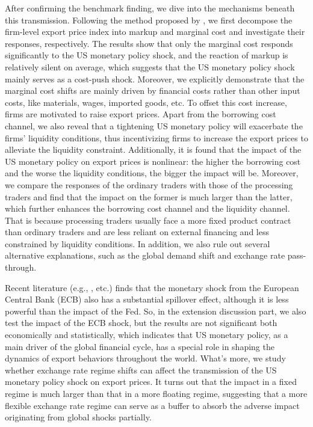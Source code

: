After confirming the benchmark finding, we dive into the mechanisms beneath this transmission. Following the method proposed by \cite{deloecker2012markups}, we first decompose the firm-level export price index into markup and marginal cost and investigate their responses, respectively. The results show that only the marginal cost responds significantly to the US monetary policy shock, and the reaction of markup is relatively silent on average, which suggests that the US monetary policy shock mainly serves as a cost-push shock. Moreover, we explicitly demonstrate that the marginal cost shifts are mainly driven by financial costs rather than other input costs, like materials, wages, imported goods, etc. To offset this cost increase, firms are motivated to raise export prices. Apart from the borrowing cost channel, we also reveal that a tightening US monetary policy will exacerbate the firms' liquidity conditions, thus incentivizing firms to increase the export prices to alleviate the liquidity constraint. Additionally, it is found that the impact of the US monetary policy on export prices is nonlinear: the higher the borrowing cost and the worse the liquidity conditions, the bigger the impact will be. Moreover, we compare the responses of the ordinary traders with those of the processing traders and find that the impact on the former is much larger than the latter, which further enhances the borrowing cost channel and the liquidity channel. That is because processing traders usually face a more fixed product contract than ordinary traders and are less reliant on external financing and less constrained by liquidity conditions. In addition, we also rule out several alternative explanations, such as the global demand shift and exchange rate pass-through.

Recent literature (e.g., \cite{miranda2022tale}, etc.) finds that the monetary shock from the European Central Bank (ECB) also has a substantial spillover effect, although it is less powerful than the impact of the Fed. So, in the extension discussion part, we also test the impact of the ECB shock, but the results are not significant both economically and statistically, which indicates that US monetary policy, as a main driver of the global financial cycle, has a special role in shaping the dynamics of export behaviors throughout the world. What's more, we study whether exchange rate regime shifts can affect the transmission of the US monetary policy shock on export prices. It turns out that the impact in a fixed regime is much larger than that in a more floating regime, suggesting that a more flexible exchange rate regime can serve as a buffer to absorb the adverse impact originating from global shocks partially. 


